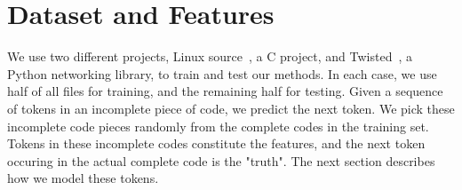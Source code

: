\section{Dataset and Features}
\label{sec:dataset}

We use two different projects, Linux source~\cite{ref:linuxcode}, a C project,
and Twisted~\cite{ref:twistedcode}, a Python networking library, to train and
test our methods. In each case, we use half of all files for training, and the
remaining half for testing.
Given a sequence of tokens in an incomplete piece of code,
we predict the next token.
We pick these incomplete code pieces randomly from the complete codes in the
training set.
Tokens in these incomplete codes constitute the features, and the next token
occuring in the actual complete code is the "truth".
The next section describes how we model these tokens.
